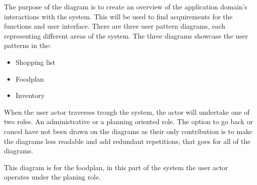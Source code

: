 The purpose of the diagram is to create an overview of the application domain's interactions with the system. This will be used to find acquirements for the functions and user interface. There are three user pattern diagrams, each representing different areas of the system. The three diagrams showcase the user patterns in the:
\begin{itemize}
\item{Shopping list}
\item{Foodplan}
\item{Inventory}
\end{itemize}

When the user actor traverses trough the system, the actor will undertake one of two roles. An administrative or a planning oriented role.
The option to go back or cancel have not been drawn on the diagrams as their only contribution is to make the diagrams less readable and add redundant repetitions, that goes for all of the diagrams.

%

This diagram is for the foodplan, in this part of the system the user actor operates under the planing role.

